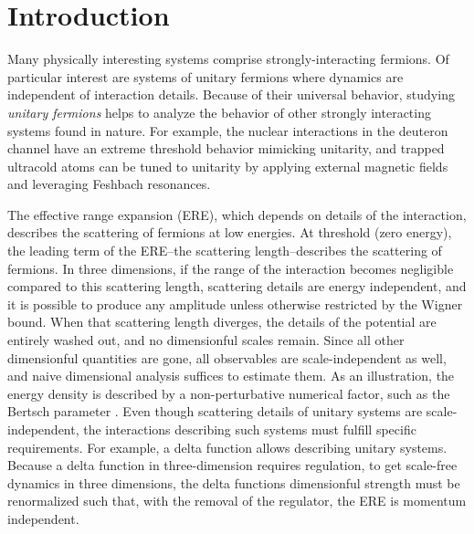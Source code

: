 \section{Introduction}\label{sec:intro}

Many physically interesting systems comprise strongly-interacting fermions.
Of particular interest are systems of unitary fermions where dynamics are independent of interaction details.
Because of their universal behavior, studying \emph{unitary fermions} helps to analyze the behavior of other strongly interacting systems found in nature.
For example, the nuclear interactions in the deuteron channel have an extreme threshold behavior mimicking unitarity, and trapped ultracold atoms can be tuned to unitarity by applying external magnetic fields and leveraging Feshbach resonances.

The effective range expansion (ERE), which depends on details of the interaction, describes the scattering of fermions at low energies.
At threshold (zero energy), the leading term of the ERE--the scattering length--describes the scattering of fermions.
In three dimensions, if the range of the interaction becomes negligible compared to this scattering length, scattering details are energy independent, and it is possible to produce any amplitude unless otherwise restricted by the Wigner bound\cite{Wigner:1955zz, Phillips:1996ae, Hammer:2010fw}.
When that scattering length diverges, the details of the potential are entirely washed out, and no dimensionful scales remain.
Since all other dimensionful quantities are gone, all observables are scale-independent as well, and naive dimensional analysis suffices to estimate them.
As an illustration, the energy density is described by a non-perturbative numerical factor, such as the Bertsch parameter\cite{PhysRevC.60.054311} .
Even though scattering details of unitary systems are scale-independent, the interactions describing such systems must fulfill specific requirements.
For example, a delta function allows describing unitary systems.
Because a delta function in three-dimension requires regulation, to get scale-free dynamics in three dimensions, the delta functions dimensionful strength must be renormalized such that, with the removal of the regulator, the ERE is momentum independent.

